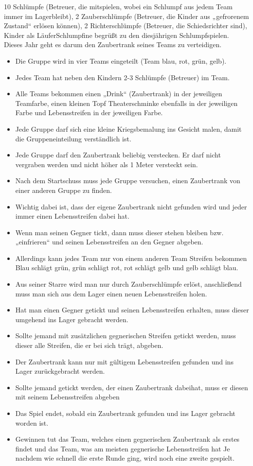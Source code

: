 10 Schlümpfe (Betreuer, die mitspielen, wobei ein Schlumpf aus jedem Team immer im Lagerbleibt), 2 Zauberschlümpfe (Betreuer, die Kinder aus „gefrorenem Zustand“ erlösen können), 2 Richterschlümpfe (Betreuer, die Schiedsrichter sind), Kinder als LäuferSchlumpfine begrüßt zu den diesjährigen Schlumpfspielen. Dieses Jahr geht es darum den Zaubertrank seines Teams zu verteidigen.
\begin{itemize}
    \item Die Gruppe wird in vier Teams eingeteilt (Team blau, rot, grün, gelb).
    \item Jedes Team hat neben den Kindern 2-3 Schlümpfe (Betreuer) im Team.
    \item Alle Teams bekommen einen „Drink“ (Zaubertrank) in der jeweiligen Teamfarbe, einen kleinen Topf Theaterschminke ebenfalls in der jeweiligen Farbe und Lebensstreifen in der jeweiligen Farbe.
    \item Jede Gruppe darf sich eine kleine Kriegsbemalung ins Gesicht malen, damit die Gruppeneinteilung verständlich ist.
    \item Jede Gruppe darf den Zaubertrank beliebig verstecken. Er darf nicht vergraben werden und nicht höher als 1 Meter versteckt sein.
    \item Nach dem Startschuss muss jede Gruppe versuchen, einen Zaubertrank von einer anderen Gruppe zu finden.
    \item Wichtig dabei ist, dass der eigene Zaubertrank nicht gefunden wird und jeder immer einen Lebensstreifen dabei hat.
    \item Wenn man seinen Gegner tickt, dann muss dieser stehen bleiben bzw. „einfrieren“ und seinen Lebensstreifen an den Gegner abgeben.
    \item Allerdings kann jedes Team nur von einem anderen Team Streifen bekommen Blau schlägt grün, grün schlägt rot, rot schlägt gelb und gelb schlägt blau.
    \item Aus seiner Starre wird man nur durch Zauberschlümpfe erlöst, anschließend muss man sich aus dem Lager einen neuen Lebensstreifen holen.
    \item Hat man einen Gegner getickt und seinen Lebensstreifen erhalten, muss dieser umgehend ins Lager gebracht werden.
    \item Sollte jemand mit zusätzlichen gegnerischen Streifen getickt werden, muss dieser alle Streifen, die er bei sich trägt, abgeben.
    \item Der Zaubertrank kann nur mit gültigem Lebensstreifen gefunden und ins Lager zurückgebracht werden.
    \item Sollte jemand getickt werden, der einen Zaubertrank dabeihat, muss er diesen mit seinem Lebensstreifen abgeben
    \item Das Spiel endet, sobald ein Zaubertrank gefunden und ins Lager gebracht worden ist.
    \item Gewinnen tut das Team, welches einen gegnerischen Zaubertrank als erstes findet und das Team, was am meisten gegnerische Lebensstreifen hat Je nachdem wie schnell die erste Runde ging, wird noch eine zweite gespielt.
\end{itemize}
